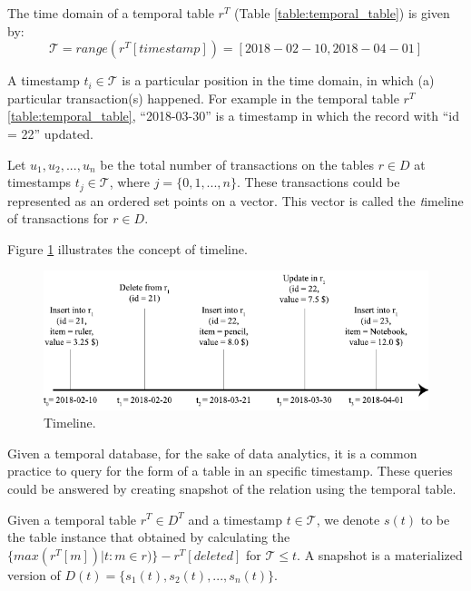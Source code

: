 		\begin{example}
			The time domain of a temporal table $r^T$ (Table \ref{table:temporal_table}) is given by:
			$$\mathcal{T} = range(r^T[timestamp]) = [2018-02-10, 2018-04-01]$$
		\label{example:time_domain}
		\end{example}
		\begin{defn}[Timestamps]
			A timestamp $t_i \in \mathcal{T}$ is a particular position in the time domain, in which (a) particular transaction(s) happened. For example in the temporal table $r^T$ \ref{table:temporal_table}, ``2018-03-30'' is a timestamp in which the record with ``id = 22'' updated.
		\label{dfn:timestamp}
		\end{defn}
		\begin{defn}[Timeline]
			Let $u_1,u_2,...,u_n$ be the total number of transactions on the tables $r \in D$ at timestamps $t_j \in \mathcal{T}$, where $j=\{0,1,...,n\}$. These transactions could be represented as an ordered set points on a vector. This vector is called the {\textit timeline of transactions} for $r \in D$.
		\label{dfn:timeline}
		\end{defn}
		Figure \ref{fig:timeline} illustrates the concept of timeline.

		\begin{figure}
			\centering
			\includegraphics[width=\textwidth]{figs/timeline.pdf}
			\caption{Timeline.}
			\label{fig:timeline}
		\end{figure}

	Given a temporal database, for the sake of data analytics, it is a common practice to query for the form of a table in an specific timestamp. These queries could be answered by creating snapshot of the relation using the temporal table. 
		\begin{defn}[Snapshot] 
			Given a temporal table $r^T \in D^T$ and a timestamp $t \in \mathcal{T}$, we denote $s(t)$ to be the table instance that obtained by calculating the $\{max(r^T[m])|t : m\in r)\}-r^T[deleted]$ for $\mathcal{T}\leq t$. A snapshot is a materialized version of $D(t) = \{s_1(t),s_2(t),...,s_n(t)\}$.
		\label{dfn:snapshot}
		\end{defn}

